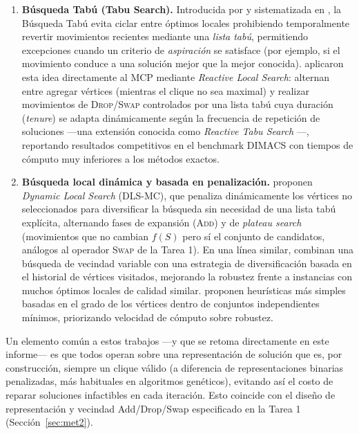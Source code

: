 \begin{enumerate}
    \item \textbf{Búsqueda Tabú (Tabu Search).} Introducida por \textcite{glover1989tabu1, glover1990tabu2} y sistematizada en \textcite{glover1997tabu}, la Búsqueda Tabú evita ciclar entre óptimos locales prohibiendo temporalmente revertir movimientos recientes mediante una \emph{lista tabú}, permitiendo excepciones cuando un criterio de \emph{aspiración} se satisface (por ejemplo, si el movimiento conduce a una solución mejor que la mejor conocida). \textcite{battiti2001reactive} aplicaron esta idea directamente al MCP mediante \emph{Reactive Local Search}: alternan entre agregar vértices (mientras el clique no sea maximal) y realizar movimientos de \textsc{Drop}/\textsc{Swap} controlados por una lista tabú cuya duración (\emph{tenure}) se adapta dinámicamente según la frecuencia de repetición de soluciones —una extensión conocida como \emph{Reactive Tabu Search} \parencite{battiti1994reactive}—, reportando resultados competitivos en el benchmark DIMACS con tiempos de cómputo muy inferiores a los métodos exactos.
    \item \textbf{Búsqueda local dinámica y basada en penalización.} \textcite{pullan2006dynamic} proponen \emph{Dynamic Local Search} (DLS-MC), que penaliza dinámicamente los vértices no seleccionados para diversificar la búsqueda sin necesidad de una lista tabú explícita, alternando fases de expansión (\textsc{Add}) y de \emph{plateau search} (movimientos que no cambian $f(S)$ pero sí el conjunto de candidatos, análogos al operador \textsc{Swap} de la Tarea 1). En una línea similar, \textcite{katayama2005effective} combinan una búsqueda de vecindad variable con una estrategia de diversificación basada en el historial de vértices visitados, mejorando la robustez frente a instancias con muchos óptimos locales de calidad similar. \textcite{singh2014_simple} proponen heurísticas más simples basadas en el grado de los vértices dentro de conjuntos independientes mínimos, priorizando velocidad de cómputo sobre robustez.
\end{enumerate}

Un elemento común a estos trabajos —y que se retoma directamente en este informe— es que todos operan sobre una representación de solución que es, por construcción, siempre un clique válido (a diferencia de representaciones binarias penalizadas, más habituales en algoritmos genéticos), evitando así el costo de reparar soluciones infactibles en cada iteración. Esto coincide con el diseño de representación y vecindad Add/Drop/Swap especificado en la Tarea 1 (Sección~\ref{sec:met2}).


